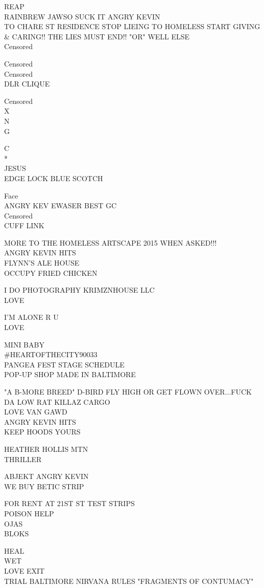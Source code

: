 \documentclass[10pt,letterpaper]{article}
\begin{document}
REAP\\
RAINBREW JAWSO SUCK IT ANGRY KEVIN\\
TO CHARE ST RESIDENCE STOP LIEING TO HOMELESS START GIVING \& CARING!! THE LIES MUST END!! "OR" WELL ELSE\\
Censored

Censored\\
Censored\\
DLR CLIQUE

Censored\\
X\\
N\\
G

C\\
*\\
JESUS\\
EDGE LOCK BLUE SCOTCH

Face\\
ANGRY KEV EWASER BEST GC\\
Censored\\
CUFF LINK

MORE TO THE HOMELESS ARTSCAPE 2015 WHEN ASKED!!!\\
ANGRY KEVIN HITS\\
FLYNN'S ALE HOUSE\\
OCCUPY FRIED CHICKEN

I DO PHOTOGRAPHY KRIMZNHOUSE LLC\\
LOVE

I'M ALONE R U\\
LOVE

MINI BABY\\
\#HEARTOFTHECITY90033\\
PANGEA FEST STAGE SCHEDULE\\
POP{-}UP SHOP MADE IN BALTIMORE

"A B{-}MORE BREED" D{-}BIRD FLY HIGH OR GET FLOWN OVER...FUCK DA LOW RAT KILLAZ CARGO\\
LOVE VAN GAWD\\
ANGRY KEVIN HITS\\
KEEP HOODS YOURS

HEATHER HOLLIS MTN\\
THRILLER

ABJEKT ANGRY KEVIN\\
WE BUY BETIC STRIP

FOR RENT AT 21ST ST TEST STRIPS\\
POISON HELP\\
OJAS\\
BLOKS

HEAL\\
WET\\
LOVE EXIT\\
TRIAL BALTIMORE NIRVANA RULES "FRAGMENTS OF CONTUMACY"
\end{document}
